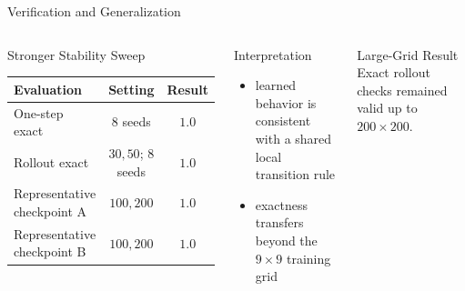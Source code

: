 \documentclass[aspectratio=169,11pt]{beamer}
\begin{document}
\begin{frame}{Verification and Generalization}
\begin{columns}[T,totalwidth=\textwidth]
\begin{block}{Stronger Stability Sweep}
\scriptsize
\begin{tabular}{@{}lcc@{}}
\toprule
Evaluation & Setting & Result \\
\midrule
One-step exact & 8 seeds & \(1.0\) \\
Rollout exact & \(30,50\); 8 seeds & \(1.0\) \\
Representative checkpoint A & \(100,200\) & \(1.0\) \\
Representative checkpoint B & \(100,200\) & \(1.0\) \\
\bottomrule
\end{tabular}
\end{block}

\begin{block}{Interpretation}
\small
\begin{itemize}
  \item learned behavior is consistent with a shared local transition rule
  \item exactness transfers beyond the \(9\times 9\) training grid
\end{itemize}
\end{block}

\begin{alertblock}{Large-Grid Result}
\small
Exact rollout checks remained valid up to \(200\times 200\).
\end{alertblock}
\end{columns}
\end{frame}
\end{document}
